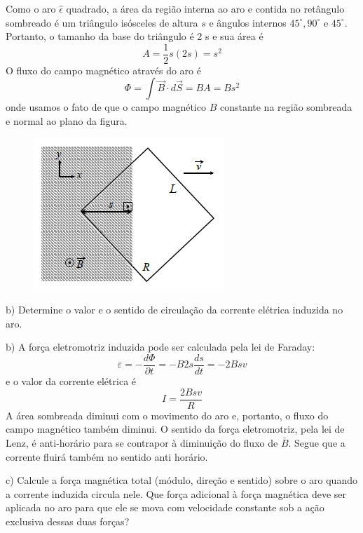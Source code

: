 \begin{enumerate}[start=1,label={\bfseries Q\arabic*.}]
\resposta Como o aro $\hat{\epsilon}$ quadrado, a área da região interna ao aro e contida no retângulo sombreado
é um triângulo isósceles de altura $s$ e ângulos internos $45^{\circ}, 90^{\circ}$ e $45^{\circ} .$ Portanto, o tamanho da base do triângulo é 2 s e sua área é
$$
A=\frac{1}{2} s(2 s)=s^{2}
$$
O fluxo do campo magnético através do aro é
$$
\Phi=\int \vec{B} \cdot d \vec{S}=B A=B s^{2}
$$
onde usamos o fato de que o campo magnético $B$ constante na região sombreada e normal ao plano da figura.
\begin{figure}[H]
  \centering
  \includegraphics[scale=0.7]{eletromag-img/aro3}
\end{figure}



b) Determine o valor e o sentido de circulação da corrente elétrica induzida no aro.

\resposta b) A força eletromotriz induzida pode ser calculada pela lei de Faraday:
$$
\varepsilon=-\frac{d \Phi}{\partial t}=-B 2 s \frac{d s}{d t}=-2 B s v
$$
e o valor da corrente elétrica é
$$
I=\frac{2 B s v}{R}
$$
A área sombreada diminui com o movimento do aro e, portanto, o fluxo do campo magnético também diminui. O sentido da força eletromotriz, pela lei de Lenz, é anti-horário para se contrapor à diminuição do fluxo de $\bar{B}$. Segue que a corrente fluirá também no sentido anti horário.

c) Calcule a força magnética total (módulo, direção e sentido) sobre o aro quando a corrente induzida circula nele. Que força adicional à força magnética deve ser aplicada no aro para que ele se mova com velocidade constante sob a ação exclusiva dessas duas forças?


\end{enumerate}
